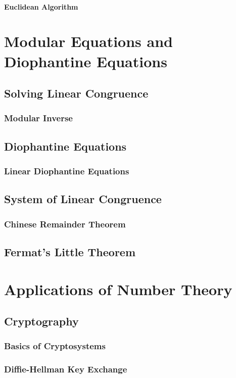 \documentclass[oneside]{book}
\begin{document}
\subsubsection{Euclidean Algorithm}

\chapter{Modular Equations and Diophantine Equations}
\section{Solving Linear Congruence}
\subsection{Modular Inverse}
\section{Diophantine Equations}
\subsection{Linear Diophantine Equations}
\section{System of Linear Congruence}
\subsection{Chinese Remainder Theorem}
\section{Fermat's Little Theorem}

\chapter{Applications of Number Theory}
\section{Cryptography}
\subsection{Basics of Cryptosystems}
\subsection{Diffie-Hellman Key Exchange}
\end{document}

